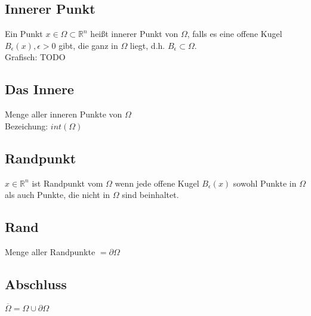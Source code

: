 \documentclass[german]{latex4ei/latex4ei_sheet}
\begin{document}
\begin{sectionbox}
	\subsection*{Innerer Punkt}
	Ein Punkt $x \in \Omega \subset \mathbb{R}^n$ hei\ss{}t innerer Punkt von $\Omega$, falls es eine offene Kugel $B_{\epsilon}(x), \epsilon > 0$ gibt, die ganz in $\Omega$ liegt, d.h. $B_{\epsilon} \subset \Omega$. \\
	Grafisch: TODO
	
	\subsection*{Das Innere}
	Menge aller inneren Punkte von $\Omega$\\
	Bezeichung: $int(\Omega)$\\
	
	\subsection*{Randpunkt}
	$x \in \mathbb{R}^n$ ist Randpunkt vom $\Omega$ wenn jede offene Kugel $B_\epsilon(x)$ sowohl Punkte in $\Omega$ als auch Punkte, die nicht in $\Omega$ sind beinhaltet.\\
	
	\subsection*{Rand}
	Menge aller Randpunkte $= \partial \Omega$\\
	
	\subsection*{Abschluss}
	$\overline{\Omega} = \Omega \cup \partial \Omega$
\end{sectionbox}
\end{document}
